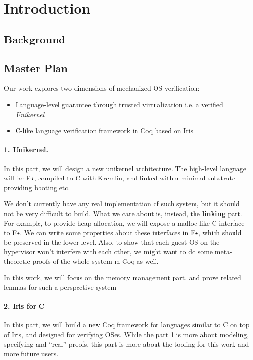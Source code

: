 \section{Introduction}
\label{sec:intro}

\subsection{Background}

\subsection{Master Plan}

Our work explores two dimensions of mechanized OS verification:

\begin{itemize}
\item Language-level guarantee through trusted virtualization i.e. a verified \emph{Unikernel}
\item C-like language verification framework in Coq based on Iris \cite{iris3}
\end{itemize}

\paragraph{1. Unikernel.} In this part, we will design a new unikernel architecture. The high-level
language will be \href{https://www.fstar-lang.org/}{F$\star$}, compiled to C with
\href{https://github.com/FStarLang/kremlin}{Kremlin},
and linked with a minimal substrate providing booting etc.

We don't currently have any real implementation of such system, but it should not be very difficult to build.
What we care about is, instead, the \textbf{linking} part.
For example, to provide heap allocation, we will expose a malloc-like C interface to F$\star$. We can write
some properties about these interfaces in F$\star$, which should be preserved in the lower level. Also, to show
that each guest OS on the hypervisor won't interfere with each other, we might want to do some meta-theoretic proofs
of the whole system in Coq as well.

In this work, we will focus on the memory management part,
and prove related lemmas for such a perspective system.

\paragraph{2. Iris for C} In this part, we will build a new Coq framework for languages similar to C on top of Iris,
and designed for verifying OSes. While the part 1 is more about modeling, specifying and ``real'' proofs, this
part is more about the tooling for this work and more future users.

